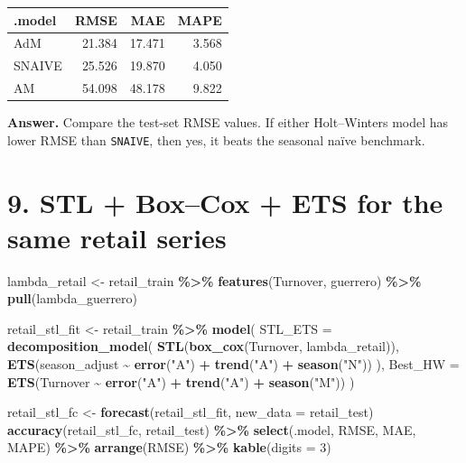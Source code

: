 \documentclass[
  11pt,
]{article}
\newenvironment{Shaded}{\begin{snugshade}}{\end{snugshade}}
\newcommand{\AttributeTok}[1]{\textcolor[rgb]{0.13,0.29,0.53}{#1}}
\newcommand{\DecValTok}[1]{\textcolor[rgb]{0.00,0.00,0.81}{#1}}
\newcommand{\FunctionTok}[1]{\textcolor[rgb]{0.13,0.29,0.53}{\textbf{#1}}}
\newcommand{\NormalTok}[1]{#1}
\newcommand{\OtherTok}[1]{\textcolor[rgb]{0.56,0.35,0.01}{#1}}
\newcommand{\SpecialCharTok}[1]{\textcolor[rgb]{0.81,0.36,0.00}{\textbf{#1}}}
\newcommand{\StringTok}[1]{\textcolor[rgb]{0.31,0.60,0.02}{#1}}
\newcounter{none} %
\begin{document}
{\def\LTcaptype{none} %
\begin{longtable}[]{@{}lrrr@{}}
\toprule\noalign{}
.model & RMSE & MAE & MAPE \\
\midrule\noalign{}
\endhead
\bottomrule\noalign{}
\endlastfoot
AdM & 21.384 & 17.471 & 3.568 \\
SNAIVE & 25.526 & 19.870 & 4.050 \\
AM & 54.098 & 48.178 & 9.822 \\
\end{longtable}
}

\textbf{Answer.} Compare the test-set RMSE values. If either
Holt--Winters model has lower RMSE than \texttt{SNAIVE}, then yes, it
beats the seasonal naïve benchmark.

\section{9. STL + Box--Cox + ETS for the same retail
series}\label{stl-boxcox-ets-for-the-same-retail-series}

\begin{Shaded}
\begin{Highlighting}[]
\NormalTok{lambda\_retail }\OtherTok{\textless{}{-}}\NormalTok{ retail\_train }\SpecialCharTok{\%\textgreater{}\%} \FunctionTok{features}\NormalTok{(Turnover, guerrero) }\SpecialCharTok{\%\textgreater{}\%} \FunctionTok{pull}\NormalTok{(lambda\_guerrero)}

\NormalTok{retail\_stl\_fit }\OtherTok{\textless{}{-}}\NormalTok{ retail\_train }\SpecialCharTok{\%\textgreater{}\%}
  \FunctionTok{model}\NormalTok{(}
    \AttributeTok{STL\_ETS =} \FunctionTok{decomposition\_model}\NormalTok{(}
      \FunctionTok{STL}\NormalTok{(}\FunctionTok{box\_cox}\NormalTok{(Turnover, lambda\_retail)),}
      \FunctionTok{ETS}\NormalTok{(season\_adjust }\SpecialCharTok{\textasciitilde{}} \FunctionTok{error}\NormalTok{(}\StringTok{"A"}\NormalTok{) }\SpecialCharTok{+} \FunctionTok{trend}\NormalTok{(}\StringTok{"A"}\NormalTok{) }\SpecialCharTok{+} \FunctionTok{season}\NormalTok{(}\StringTok{"N"}\NormalTok{))}
\NormalTok{    ),}
    \AttributeTok{Best\_HW =} \FunctionTok{ETS}\NormalTok{(Turnover }\SpecialCharTok{\textasciitilde{}} \FunctionTok{error}\NormalTok{(}\StringTok{"A"}\NormalTok{) }\SpecialCharTok{+} \FunctionTok{trend}\NormalTok{(}\StringTok{"A"}\NormalTok{) }\SpecialCharTok{+} \FunctionTok{season}\NormalTok{(}\StringTok{"M"}\NormalTok{))}
\NormalTok{  )}

\NormalTok{retail\_stl\_fc }\OtherTok{\textless{}{-}} \FunctionTok{forecast}\NormalTok{(retail\_stl\_fit, }\AttributeTok{new\_data =}\NormalTok{ retail\_test)}
\FunctionTok{accuracy}\NormalTok{(retail\_stl\_fc, retail\_test) }\SpecialCharTok{\%\textgreater{}\%} \FunctionTok{select}\NormalTok{(.model, RMSE, MAE, MAPE) }\SpecialCharTok{\%\textgreater{}\%} \FunctionTok{arrange}\NormalTok{(RMSE) }\SpecialCharTok{\%\textgreater{}\%} \FunctionTok{kable}\NormalTok{(}\AttributeTok{digits =} \DecValTok{3}\NormalTok{)}
\end{Highlighting}
\end{Shaded}
\end{document}
